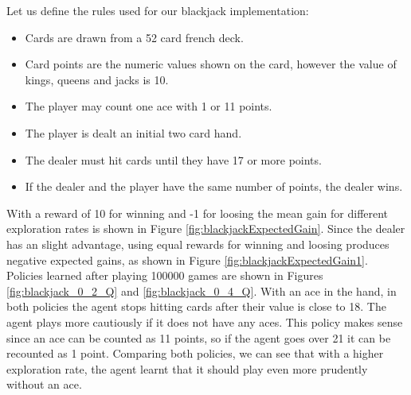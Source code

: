 \documentclass[12pt]{article}
\begin{document}
Let us define the rules used for our blackjack implementation:

\begin{itemize}
  \item Cards are drawn from a 52 card french deck.
  \item Card points are the numeric values shown on the card, however the value of kings, queens and jacks is 10.
  \item The player may count one ace with 1 or 11 points.
  \item The player is dealt an initial two card hand.
  \item The dealer must hit cards until they have 17 or more points.
  \item If the dealer and the player have the same number of points, the dealer wins.
\end{itemize}

With a reward of 10 for winning and -1 for loosing the mean gain for different exploration rates is shown in  Figure \ref{fig:blackjackExpectedGain}.
Since the dealer has an slight advantage, using equal rewards for winning and loosing produces negative expected gains, as shown in Figure \ref{fig:blackjackExpectedGain1}.
Policies learned after playing 100000 games are shown in Figures \ref{fig:blackjack_0_2_Q} and \ref{fig:blackjack_0_4_Q}.
With an ace in the hand, in both policies the agent stops hitting cards after their value is close to 18.
The agent plays more cautiously if it does not have any aces.
This policy makes sense since an ace can be counted as 11 points, so if the agent goes over 21 it can be recounted as 1 point.
Comparing both policies, we can see that with a higher exploration rate, the agent learnt that it should play even more prudently without an ace.
\end{document}
